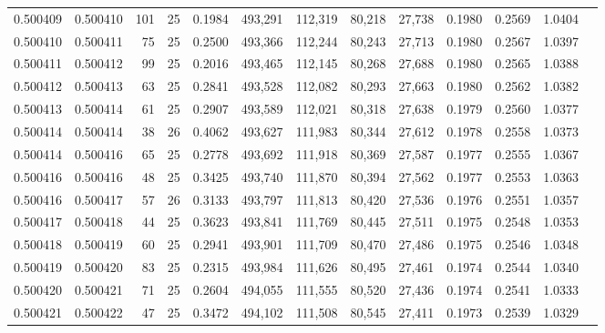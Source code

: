 \begin{tabular}{rrrrrrrrrrrrr}
0.500409 & 0.500410 & 101 &  25 &                                     0.1984 & 493,291 & 112,319 &  80,218 &  27,738 & 0.1980 & 0.2569 & 1.0404 \\
0.500410 & 0.500411 &  75 &  25 &                                     0.2500 & 493,366 & 112,244 &  80,243 &  27,713 & 0.1980 & 0.2567 & 1.0397 \\
0.500411 & 0.500412 &  99 &  25 &                                     0.2016 & 493,465 & 112,145 &  80,268 &  27,688 & 0.1980 & 0.2565 & 1.0388 \\
0.500412 & 0.500413 &  63 &  25 &                                     0.2841 & 493,528 & 112,082 &  80,293 &  27,663 & 0.1980 & 0.2562 & 1.0382 \\
0.500413 & 0.500414 &  61 &  25 &                                     0.2907 & 493,589 & 112,021 &  80,318 &  27,638 & 0.1979 & 0.2560 & 1.0377 \\
0.500414 & 0.500414 &  38 &  26 &                                     0.4062 & 493,627 & 111,983 &  80,344 &  27,612 & 0.1978 & 0.2558 & 1.0373 \\
0.500414 & 0.500416 &  65 &  25 &                                     0.2778 & 493,692 & 111,918 &  80,369 &  27,587 & 0.1977 & 0.2555 & 1.0367 \\
0.500416 & 0.500416 &  48 &  25 &                                     0.3425 & 493,740 & 111,870 &  80,394 &  27,562 & 0.1977 & 0.2553 & 1.0363 \\
0.500416 & 0.500417 &  57 &  26 &                                     0.3133 & 493,797 & 111,813 &  80,420 &  27,536 & 0.1976 & 0.2551 & 1.0357 \\
0.500417 & 0.500418 &  44 &  25 &                                     0.3623 & 493,841 & 111,769 &  80,445 &  27,511 & 0.1975 & 0.2548 & 1.0353 \\
0.500418 & 0.500419 &  60 &  25 &                                     0.2941 & 493,901 & 111,709 &  80,470 &  27,486 & 0.1975 & 0.2546 & 1.0348 \\
0.500419 & 0.500420 &  83 &  25 &                                     0.2315 & 493,984 & 111,626 &  80,495 &  27,461 & 0.1974 & 0.2544 & 1.0340 \\
0.500420 & 0.500421 &  71 &  25 &                                     0.2604 & 494,055 & 111,555 &  80,520 &  27,436 & 0.1974 & 0.2541 & 1.0333 \\
0.500421 & 0.500422 &  47 &  25 &                                     0.3472 & 494,102 & 111,508 &  80,545 &  27,411 & 0.1973 & 0.2539 & 1.0329 \\

\end{tabular}
